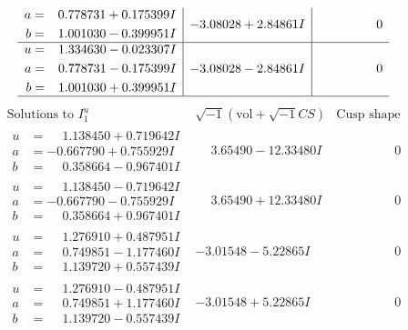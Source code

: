 \documentclass[1p]{elsarticle_modified}
\theoremstyle{definition}
\newcommand{\I}{\sqrt{-1}}
\begin{document}
$$\begin{array}{c|c|c}
\begin{aligned}
a &= \phantom{-}0.778731 + 0.175399 I \\
b &= \phantom{-}1.001030 - 0.399951 I\end{aligned}
 & -3.08028 + 2.84861 I & \phantom{-0.000000 } 0 \\ \hline\begin{aligned}
u &= \phantom{-}1.334630 - 0.023307 I \\
a &= \phantom{-}0.778731 - 0.175399 I \\
b &= \phantom{-}1.001030 + 0.399951 I\end{aligned}
 & -3.08028 - 2.84861 I & \phantom{-0.000000 } 0\\
 \hline 
 \end{array}$$\newpage$$\begin{array}{c|c|c}  
\text{Solutions to }I^u_{1}& \I (\text{vol} + \sqrt{-1}CS) & \text{Cusp shape}\\
 \hline 
\begin{aligned}
u &= \phantom{-}1.138450 + 0.719642 I \\
a &= -0.667790 + 0.755929 I \\
b &= \phantom{-}0.358664 - 0.967401 I\end{aligned}
 & \phantom{-}3.65490 - 12.33480 I & \phantom{-0.000000 } 0 \\ \hline\begin{aligned}
u &= \phantom{-}1.138450 - 0.719642 I \\
a &= -0.667790 - 0.755929 I \\
b &= \phantom{-}0.358664 + 0.967401 I\end{aligned}
 & \phantom{-}3.65490 + 12.33480 I & \phantom{-0.000000 } 0 \\ \hline\begin{aligned}
u &= \phantom{-}1.276910 + 0.487951 I \\
a &= \phantom{-}0.749851 - 1.177460 I \\
b &= \phantom{-}1.139720 + 0.557439 I\end{aligned}
 & -3.01548 - 5.22865 I & \phantom{-0.000000 } 0 \\ \hline\begin{aligned}
u &= \phantom{-}1.276910 - 0.487951 I \\
a &= \phantom{-}0.749851 + 1.177460 I \\
b &= \phantom{-}1.139720 - 0.557439 I\end{aligned}
 & -3.01548 + 5.22865 I & \phantom{-0.000000 } 0 \\ \hline\begin{aligned}

\end{aligned}
\end{array}$$
\end{document}
